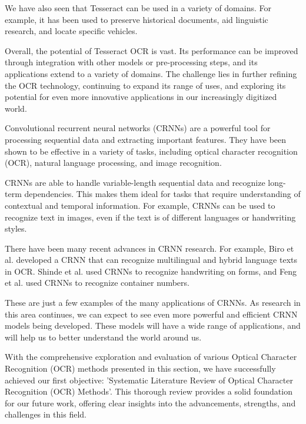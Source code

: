 We have also seen that Tesseract can be used in a variety of domains. For example, it has been used to preserve historical documents, aid linguistic research, and locate specific vehicles.

Overall, the potential of Tesseract OCR is vast. Its performance can be improved through integration with other models or pre-processing steps, and its applications extend to a variety of domains. The challenge lies in further refining the OCR technology, continuing to expand its range of uses, and exploring its potential for even more innovative applications in our increasingly digitized world.

Convolutional recurrent neural networks (CRNNs) are a powerful tool for processing sequential data and extracting important features. They have been shown to be effective in a variety of tasks, including optical character recognition (OCR), natural language processing, and image recognition.

CRNNs are able to handle variable-length sequential data and recognize long-term dependencies. This makes them ideal for tasks that require understanding of contextual and temporal information. For example, CRNNs can be used to recognize text in images, even if the text is of different languages or handwriting styles.

There have been many recent advances in CRNN research. For example, Biro et al. developed a CRNN that can recognize multilingual and hybrid language texts in OCR. Shinde et al. used CRNNs to recognize handwriting on forms, and Feng et al. used CRNNs to recognize container numbers.

These are just a few examples of the many applications of CRNNs. As research in this area continues, we can expect to see even more powerful and efficient CRNN models being developed. These models will have a wide range of applications, and will help us to better understand the world around us.

With the comprehensive exploration and evaluation of various Optical Character Recognition (OCR) methods presented in this section, we have successfully achieved our first objective: 'Systematic Literature Review of Optical Character Recognition (OCR) Methods'. This thorough review provides a solid foundation for our future work, offering clear insights into the advancements, strengths, and challenges in this field.